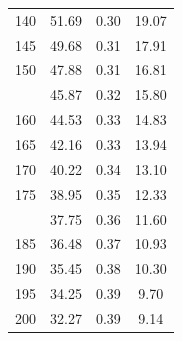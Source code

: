 \documentclass[12pt]{article}
\begin{document}
\begin{minipage}{0.5\textwidth}
\begin{tabular}{rccc}
    140 & 51.69 & 0.30 & 19.07 \\ 
    145 & 49.68 & 0.31 & 17.91 \\ 
    150 & 47.88 & 0.31 & 16.81 \\  \addlinespace
    155 & 45.87 & 0.32 & 15.80 \\ 
    160 & 44.53 & 0.33 & 14.83 \\ 
    165 & 42.16 & 0.33 & 13.94 \\ 
    170 & 40.22 & 0.34 & 13.10 \\ 
    175 & 38.95 & 0.35 & 12.33 \\  \addlinespace
    180 & 37.75 & 0.36 & 11.60 \\ 
    185 & 36.48 & 0.37 & 10.93 \\ 
    190 & 35.45 & 0.38 & 10.30 \\ 
    195 & 34.25 & 0.39 & 9.70 \\ 
    200 & 32.27 & 0.39 & 9.14 \\ 

\bottomrule
\end{tabular}

\end{minipage} \hfill
\end{document}
